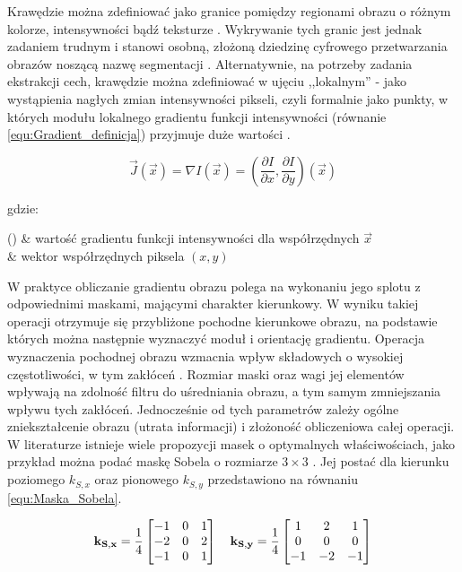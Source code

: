 Krawędzie można zdefiniować jako granice pomiędzy regionami obrazu o różnym kolorze, intensywności bądź teksturze \cite{Szeliski2011}. Wykrywanie tych granic jest jednak zadaniem trudnym i stanowi osobną, złożoną dziedzinę cyfrowego przetwarzania obrazów noszącą nazwę segmentacji \cite{Szeliski2011}. Alternatywnie, na potrzeby zadania ekstrakcji cech, krawędzie można zdefiniować w ujęciu ,,lokalnym'' - jako wystąpienia nagłych zmian intensywności pikseli, czyli formalnie jako punkty, w których modułu lokalnego gradientu funkcji intensywności (równanie \ref{equ:Gradient_definicja}) przyjmuje duże wartości \cite{Szeliski2011}.

\begin{equation}
\label{equ:Gradient_definicja}
	\vec{J}(\vec{x}) =  \nabla I (\vec{x}) = (\frac{\partial I}{\partial x}, \frac{\partial I}{\partial y})(\vec{x})
\end{equation}

\noindent
gdzie:

\begin{conditions}
	() & wartość gradientu funkcji intensywności dla współrzędnych $\vec{x}$ \\
	 & wektor współrzędnych piksela $(x, y)$ \\
\end{conditions}

W praktyce obliczanie gradientu obrazu polega na wykonaniu jego splotu z odpowiednimi maskami, mającymi charakter kierunkowy. W wyniku takiej operacji otrzymuje się przybliżone pochodne kierunkowe obrazu, na podstawie których można następnie wyznaczyć moduł i orientację gradientu. Operacja wyznaczenia pochodnej obrazu wzmacnia wpływ składowych o wysokiej częstotliwości, w tym zakłóceń \cite{Szeliski2011}. Rozmiar maski oraz wagi jej elementów wpływają na zdolność filtru do uśredniania obrazu, a tym samym zmniejszania wpływu tych zakłóceń. Jednocześnie od tych parametrów zależy ogólne zniekształcenie obrazu (utrata informacji) i złożoność obliczeniowa całej operacji. W literaturze istnieje wiele propozycji masek o optymalnych właściwościach, jako przykład można podać maskę Sobela o rozmiarze $3 \times 3$ \cite{Treiber2010}. Jej postać dla kierunku poziomego $k_{S,x}$ oraz pionowego $k_{S,y}$ przedstawiono na równaniu \ref{equ:Maska_Sobela}.

\begin{equation}
\label{equ:Maska_Sobela}
	\mathbf{k_{S,x}} = \frac{1}{4} \begin{bmatrix} -1 & 0 & 1 \\ -2 & 0 & 2 \\ -1 & 0 & 1 \\ \end{bmatrix}
	\, \, \, \, \, \,
	\mathbf{k_{S,y}} = \frac{1}{4} \begin{bmatrix} 1 & 2 & 1 \\ 0 & 0 & 0 \\ -1 & -2 & -1 \\ \end{bmatrix}
\end{equation}

